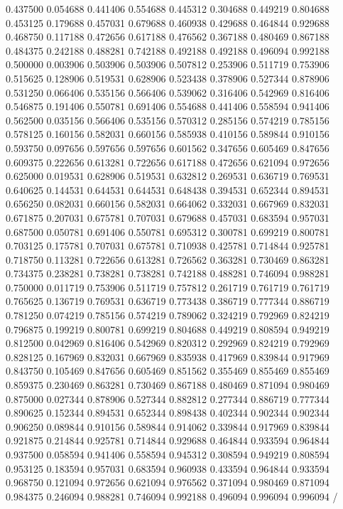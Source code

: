 0.437500   0.054688   
0.441406   0.554688   
0.445312   0.304688   
0.449219   0.804688   
0.453125   0.179688   
0.457031   0.679688   
0.460938   0.429688   
0.464844   0.929688   
0.468750   0.117188   
0.472656   0.617188   
0.476562   0.367188   
0.480469   0.867188   
0.484375   0.242188   
0.488281   0.742188   
0.492188   0.492188   
0.496094   0.992188   
0.500000   0.003906   
0.503906   0.503906   
0.507812   0.253906   
0.511719   0.753906   
0.515625   0.128906   
0.519531   0.628906   
0.523438   0.378906   
0.527344   0.878906   
0.531250   0.066406   
0.535156   0.566406   
0.539062   0.316406   
0.542969   0.816406   
0.546875   0.191406   
0.550781   0.691406   
0.554688   0.441406   
0.558594   0.941406   
0.562500   0.035156   
0.566406   0.535156   
0.570312   0.285156   
0.574219   0.785156   
0.578125   0.160156   
0.582031   0.660156   
0.585938   0.410156   
0.589844   0.910156   
0.593750   0.097656   
0.597656   0.597656   
0.601562   0.347656   
0.605469   0.847656   
0.609375   0.222656   
0.613281   0.722656   
0.617188   0.472656   
0.621094   0.972656   
0.625000   0.019531   
0.628906   0.519531   
0.632812   0.269531   
0.636719   0.769531   
0.640625   0.144531   
0.644531   0.644531   
0.648438   0.394531   
0.652344   0.894531   
0.656250   0.082031   
0.660156   0.582031   
0.664062   0.332031   
0.667969   0.832031   
0.671875   0.207031   
0.675781   0.707031   
0.679688   0.457031   
0.683594   0.957031   
0.687500   0.050781   
0.691406   0.550781   
0.695312   0.300781   
0.699219   0.800781   
0.703125   0.175781   
0.707031   0.675781   
0.710938   0.425781   
0.714844   0.925781   
0.718750   0.113281   
0.722656   0.613281   
0.726562   0.363281   
0.730469   0.863281   
0.734375   0.238281   
0.738281   0.738281   
0.742188   0.488281   
0.746094   0.988281   
0.750000   0.011719   
0.753906   0.511719   
0.757812   0.261719   
0.761719   0.761719   
0.765625   0.136719   
0.769531   0.636719   
0.773438   0.386719   
0.777344   0.886719   
0.781250   0.074219   
0.785156   0.574219   
0.789062   0.324219   
0.792969   0.824219   
0.796875   0.199219   
0.800781   0.699219   
0.804688   0.449219   
0.808594   0.949219   
0.812500   0.042969   
0.816406   0.542969   
0.820312   0.292969   
0.824219   0.792969   
0.828125   0.167969   
0.832031   0.667969   
0.835938   0.417969   
0.839844   0.917969   
0.843750   0.105469   
0.847656   0.605469   
0.851562   0.355469   
0.855469   0.855469   
0.859375   0.230469   
0.863281   0.730469   
0.867188   0.480469   
0.871094   0.980469   
0.875000   0.027344   
0.878906   0.527344   
0.882812   0.277344   
0.886719   0.777344   
0.890625   0.152344   
0.894531   0.652344   
0.898438   0.402344   
0.902344   0.902344   
0.906250   0.089844   
0.910156   0.589844   
0.914062   0.339844   
0.917969   0.839844   
0.921875   0.214844   
0.925781   0.714844   
0.929688   0.464844   
0.933594   0.964844   
0.937500   0.058594   
0.941406   0.558594   
0.945312   0.308594   
0.949219   0.808594   
0.953125   0.183594   
0.957031   0.683594   
0.960938   0.433594   
0.964844   0.933594   
0.968750   0.121094   
0.972656   0.621094   
0.976562   0.371094   
0.980469   0.871094   
0.984375   0.246094   
0.988281   0.746094   
0.992188   0.496094   
0.996094   0.996094
/